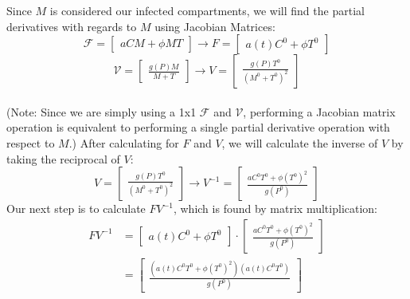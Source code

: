 \documentclass[12pt]{article}
\begin{document}
        Since $M$ is considered our infected compartments, we will find the partial derivatives with regards to $M$ using Jacobian Matrices:
        $$\mathscr{F} = \begin{bmatrix}
                            aCM + \phi MT
                        \end{bmatrix}
            \longrightarrow
            F = \begin{bmatrix}
                a(t)C^{0} + \phi T^{0}
            \end{bmatrix}
        $$
        $$\mathscr{V} = \begin{bmatrix}
                            \frac{g(P)M}{M+T}
                        \end{bmatrix}
                        \longrightarrow
          V = \begin{bmatrix}
                \frac{g(P)T^{0}}{(M^{0}+T^{0})^{2}}
              \end{bmatrix}
        $$\\
        (Note: Since we are simply using a 1x1 $\mathscr{F}$ and $\mathscr{V}$, performing a Jacobian matrix operation is equivalent to performing a single partial derivative operation with respect to $M$.)
        After calculating for $F$ and $V$, we will calculate the inverse of $V$ by taking the reciprocal of $V$:
        $$V = \begin{bmatrix}
                \frac{g(P)T^{0}}{(M^{0}+T^{0})^{2}}
              \end{bmatrix}
          \longrightarrow
          V^{-1} = \begin{bmatrix}
                    \frac{aC^{0}T^{0} + \phi (T^{0})^{2}}{g(P^{0})}
                  \end{bmatrix}
        $$
        Our next step is to calculate $FV^{-1}$, which is found by matrix multiplication:
        \begin{align*}
            FV^{-1} &=\begin{bmatrix}
                            a(t)C^{0} + \phi T^{0}
                        \end{bmatrix}
                        \cdot
                        \begin{bmatrix}
                            \frac{aC^{0}T^{0} + \phi (T^{0})^{2}}{g(P^{0})}
                        \end{bmatrix} 
                    \\
                    &= \begin{bmatrix}
                            \frac{(a(t)C^{0}T^{0}+\phi (T^{0})^{2})(a(t)C^{0}T^{0})}{g(P^{0})}
                        \end{bmatrix}
        \end{align*}
        
\end{document}
